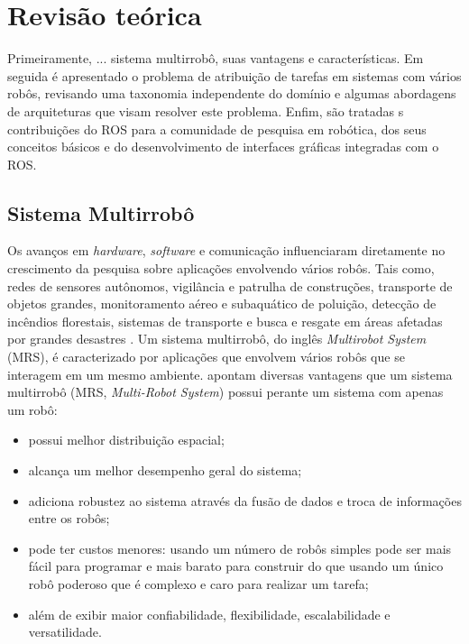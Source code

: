 \chapter[Revisão Teórica]{Revisão teórica} \label{cap:revisao}
    Primeiramente, ... sistema multirrobô, suas vantagens e características. Em seguida é apresentado o problema de atribuição de tarefas em sistemas com vários robôs, revisando uma taxonomia independente do domínio e algumas abordagens de arquiteturas que visam resolver este problema. Enfim, são tratadas s contribuições do ROS para a comunidade de pesquisa em robótica, dos seus conceitos básicos e do desenvolvimento de interfaces gráficas integradas com o ROS.
    
    \section{Sistema Multirrobô} \label{sec:mrs}
        Os avanços em \textit{hardware}, \textit{software} e comunicação influenciaram diretamente no crescimento da pesquisa sobre aplicações envolvendo vários robôs. Tais como, redes de sensores autônomos, vigilância e patrulha de construções, transporte de objetos grandes, monitoramento aéreo e subaquático de poluição, detecção de incêndios florestais, sistemas de transporte e busca e resgate em áreas afetadas por grandes desastres \cite{ref:lima2005multi}. Um sistema multirrobô, do inglês \textit{Multirobot System} (MRS), é caracterizado por aplicações que envolvem vários robôs que se interagem em um mesmo ambiente.  apontam diversas vantagens que um sistema multirrobô (MRS, \textit{Multi-Robot System}) possui perante um sistema com apenas um robô:
        
        \begin{itemize}
            \item possui melhor distribuição espacial;
            \item alcança um melhor desempenho geral do sistema;
            \item adiciona robustez ao sistema através da fusão de dados e troca de informações entre os robôs;
            \item pode ter custos menores: usando um número de robôs simples pode ser mais fácil para programar e mais barato para construir do que usando um único robô poderoso que é complexo e caro para realizar um tarefa;
            \item além de exibir maior confiabilidade, flexibilidade, escalabilidade e versatilidade.
        \end{itemize}
        
